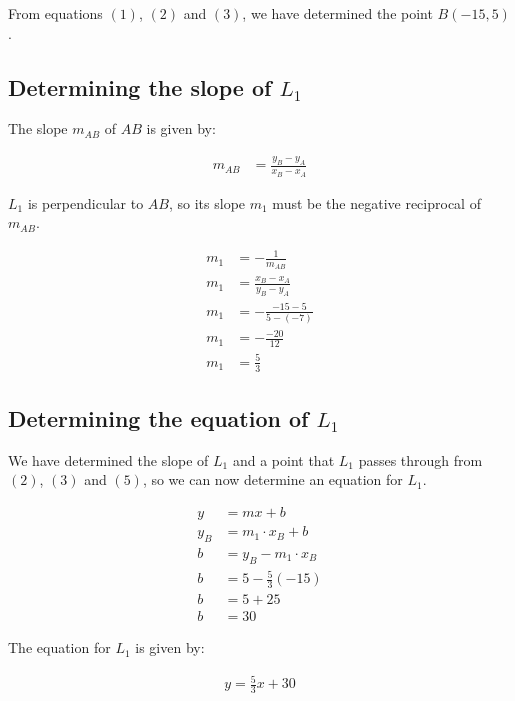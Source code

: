 \documentclass[12pt]{article}
\begin{document}
From equations $(1)$, $(2)$ and $(3)$, we have determined the point $B(-15,5)$.

\subsection{Determining the slope of $L_1$}

The slope $m_{AB}$ of $AB$ is given by:

\begin{equation}
\begin{split}
m_{AB} &= \frac{y_B - y_A}{x_B - x_A}
\end{split}
\end{equation}

$L_1$ is perpendicular to $AB$, so its slope $m_1$ must be the negative reciprocal of $m_{AB}$.

\begin{equation}
\begin{split}
m_{1} &= -\frac{1}{m_{AB}}\\
m_{1}&= \frac{x_B - x_A}{y_B - y_A}\\
m_{1}&= -\frac{-15 -5}{5 - (-7)}\\
m_{1}&= -\frac{-20}{12}\\
m_{1}&= \frac{5}{3}
\end{split}
\end{equation}

\newpage

\subsection{Determining the equation of $L_1$}

We have determined the slope of $L_1$ and a point that $L_1$ passes through from $(2)$, $(3)$ and $(5)$, so we can now determine an equation for $L_1$.

\begin{equation}\begin{split}
y &= mx + b\\
y_B &= m_1\cdot x_B + b\\
b &= y_B - m_1\cdot x_B\\
b &= 5 - \frac{5}{3}(-15)\\
b &= 5 + 25\\
b &= 30
\end{split}\end{equation}

The equation for $L_1$ is given by:

\begin{equation}\begin{split}
y = \frac{5}{3}x + 30
\end{split}\end{equation}
\end{document}
